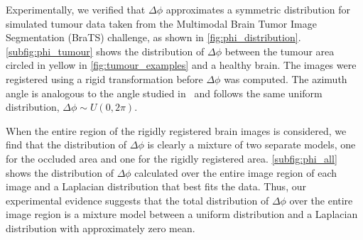 Experimentally, we verified that $\Delta \phi$ approximates a symmetric
distribution for simulated tumour data taken from the Multimodal Brain Tumor
Image Segmentation (BraTS) challenge, as shown in
\cref{fig:phi_distribution}. \cref{subfig:phi_tumour} shows the
distribution of $\Delta \phi$ between the tumour area circled in yellow in
\cref{fig:tumour_examples} and a healthy brain. The images were registered
using a rigid transformation before $\Delta \phi$ was computed.  The azimuth
angle is analogous to the angle studied in~\cite{RefWorks:68} and follows the
same uniform distribution, $\Delta \phi \sim U(0, 2\pi)$.

When the entire region of the rigidly registered brain images is considered, we
find that the distribution of $\Delta \phi$ is clearly a mixture of two separate
models, one for the occluded area and one for the rigidly registered area.
\cref{subfig:phi_all} shows the distribution of $\Delta \phi$ calculated
over the entire image region of each image and a Laplacian distribution that
best fits the data. Thus, our experimental evidence suggests that the total
distribution of $\Delta \phi$ over the entire image region is a mixture model
between a uniform distribution and a Laplacian distribution with approximately
zero mean.
